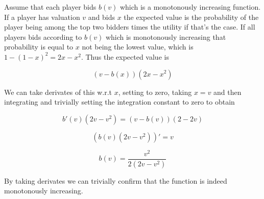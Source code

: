 Assume that each player bids $b(v)$ which is a monotonously increasing function. If a player has valuation $v$ and bids $x$ the expected value is the probability of the player being among the top two bidders times the utility if that's the case. If all players bids according to $b(v)$ which is monotonously increasing that probability is equal to $x$ not being the lowest value, which is $1-(1-x)^2 = 2x-x^2$. Thus the expected value is

$$
(v-b(x))(2x-x^2)
$$

We can take derivates of this w.r.t $x$, setting to zero, taking $x=v$ and then integrating and trivially setting the integration constant to zero to obtain

$$
b'(v)(2v-v^2) = (v-b(v))(2-2v)
$$

$$
(b(v)(2v-v^2))' = v
$$

$$
b(v) = \frac{v^2}{2(2v-v^2)}
$$

By taking derivates we can trivially confirm that the function is indeed monotonously increasing.
